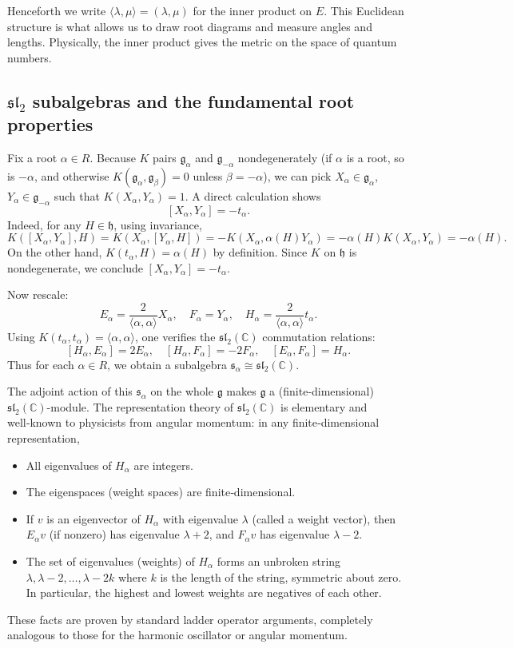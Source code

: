 \documentclass{article}
\theoremstyle{definition}
\theoremstyle{remark}
\newcommand{\K}{K}
\newcommand{\g}{\mathfrak{g}}
\newcommand{\h}{\mathfrak{h}}
\newcommand{\C}{\mathbb{C}}
\begin{document}
Henceforth we write $\langle \lambda,\mu\rangle = (\lambda,\mu)$ for the inner product
on $E$. This Euclidean structure is what allows us to draw root diagrams and measure
angles and lengths. Physically, the inner product gives the metric on the space of
quantum numbers.

\subsection{$\mathfrak{sl}_2$ subalgebras and the fundamental root properties}
Fix a root $\alpha\in R$. Because $\K$ pairs $\g_\alpha$ and $\g_{-\alpha}$ nondegenerately
(if $\alpha$ is a root, so is $-\alpha$, and otherwise $\K(\g_\alpha,\g_\beta)=0$ unless
$\beta=-\alpha$), we can pick $X_\alpha\in\g_\alpha$, $Y_\alpha\in\g_{-\alpha}$ such that
$\K(X_\alpha,Y_\alpha)=1$. A direct calculation shows
\[
[X_\alpha,Y_\alpha] = -t_\alpha.
\]
Indeed, for any $H\in\h$, using invariance,
\[
\K([X_\alpha,Y_\alpha],H) = \K(X_\alpha,[Y_\alpha,H]) = -\K(X_\alpha,\alpha(H)Y_\alpha)
= -\alpha(H)\K(X_\alpha,Y_\alpha) = -\alpha(H).
\]
On the other hand, $\K(t_\alpha,H) = \alpha(H)$ by definition. Since $\K$ on $\h$ is
nondegenerate, we conclude $[X_\alpha,Y_\alpha] = -t_\alpha$.

Now rescale:
\[
E_\alpha = \frac{2}{\langle\alpha,\alpha\rangle}X_\alpha,\quad
F_\alpha = Y_\alpha,\quad
H_\alpha = \frac{2}{\langle\alpha,\alpha\rangle}t_\alpha.
\]
Using $\K(t_\alpha,t_\alpha) = \langle\alpha,\alpha\rangle$, one verifies the
$\mathfrak{sl}_2(\C)$ commutation relations:
\[
[H_\alpha, E_\alpha] = 2E_\alpha,\quad [H_\alpha, F_\alpha] = -2F_\alpha,\quad
[E_\alpha, F_\alpha] = H_\alpha.
\]
Thus for each $\alpha\in R$, we obtain a subalgebra $\mathfrak{s}_\alpha \cong \mathfrak{sl}_2(\C)$.

The adjoint action of this $\mathfrak{s}_\alpha$ on the whole $\g$ makes $\g$ a
(finite‑dimensional) $\mathfrak{sl}_2(\C)$-module. The representation theory of
$\mathfrak{sl}_2(\C)$ is elementary and well‑known to physicists from angular
momentum: in any finite‑dimensional representation,
\begin{itemize}
  \item All eigenvalues of $H_\alpha$ are integers.
  \item The eigenspaces (weight spaces) are finite‑dimensional.
  \item If $v$ is an eigenvector of $H_\alpha$ with eigenvalue $\lambda$ (called a
    weight vector), then $E_\alpha v$ (if nonzero) has eigenvalue $\lambda+2$, and
    $F_\alpha v$ has eigenvalue $\lambda-2$.
  \item The set of eigenvalues (weights) of $H_\alpha$ forms an unbroken string
    $\lambda, \lambda-2, \dots, \lambda-2k$ where $k$ is the length of the string,
    symmetric about zero. In particular, the highest and lowest weights are
    negatives of each other.
\end{itemize}
These facts are proven by standard ladder operator arguments, completely analogous
to those for the harmonic oscillator or angular momentum.
\end{document}
